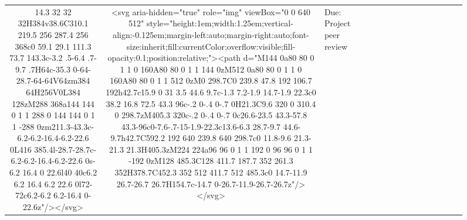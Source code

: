 \documentclass[
]{article}
\begin{document}
\begin{figure*}
\begin{longtable*}{cclllccccccccccl}
14.3 32 32 32H384v38.6C310.1 219.5 256 287.4 256 368c0 59.1 29.1 111.3 73.7 143.3c-3.2 .5-6.4 .7-9.7 .7H64c-35.3 0-64-28.7-64-64V64zm384 64H256V0L384 128zM288 368a144 144 0 1 1 288 0 144 144 0 1 1 -288 0zm211.3-43.3c-6.2-6.2-16.4-6.2-22.6 0L416 385.4l-28.7-28.7c-6.2-6.2-16.4-6.2-22.6 0s-6.2 16.4 0 22.6l40 40c6.2 6.2 16.4 6.2 22.6 0l72-72c6.2-6.2 6.2-16.4 0-22.6z"/></svg> & <svg aria-hidden="true" role="img" viewBox="0 0 640 512" style="height:1em;width:1.25em;vertical-align:-0.125em;margin-left:auto;margin-right:auto;font-size:inherit;fill:currentColor;overflow:visible;fill-opacity:0.1;position:relative;"><path d="M144 0a80 80 0 1 1 0 160A80 80 0 1 1 144 0zM512 0a80 80 0 1 1 0 160A80 80 0 1 1 512 0zM0 298.7C0 239.8 47.8 192 106.7 192h42.7c15.9 0 31 3.5 44.6 9.7c-1.3 7.2-1.9 14.7-1.9 22.3c0 38.2 16.8 72.5 43.3 96c-.2 0-.4 0-.7 0H21.3C9.6 320 0 310.4 0 298.7zM405.3 320c-.2 0-.4 0-.7 0c26.6-23.5 43.3-57.8 43.3-96c0-7.6-.7-15-1.9-22.3c13.6-6.3 28.7-9.7 44.6-9.7h42.7C592.2 192 640 239.8 640 298.7c0 11.8-9.6 21.3-21.3 21.3H405.3zM224 224a96 96 0 1 1 192 0 96 96 0 1 1 -192 0zM128 485.3C128 411.7 187.7 352 261.3 352H378.7C452.3 352 512 411.7 512 485.3c0 14.7-11.9 26.7-26.7 26.7H154.7c-14.7 0-26.7-11.9-26.7-26.7z"/></svg> & Due: Project peer review \\ 

\end{longtable*}
\end{figure*}
\end{document}
